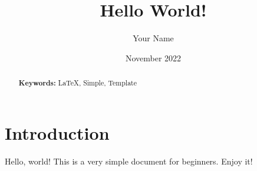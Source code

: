 \documentclass[a4paper,12pt]{article}
\title{Hello World!}
\author{Your Name}
\date{November 2022}
\begin{document}
\maketitle

\begin{abstract}
    \lipsum[1]

    \vspace{1em}
    \noindent\textbf{Keywords:} LaTeX, Simple, Template
\end{abstract}

\section{Introduction}
Hello, world! This is a very simple document for beginners.
Enjoy it!

\lipsum[1-5]
\end{document}
